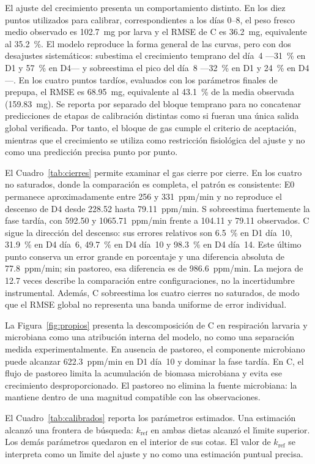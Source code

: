 El ajuste del crecimiento presenta un comportamiento distinto. En los diez puntos utilizados para calibrar, correspondientes a los días 0--8, el peso fresco medio observado es 102.7~mg por larva y el RMSE de C es 36.2~mg, equivalente al 35.2~\%. El modelo reproduce la forma general de las curvas, pero con dos desajustes sistemáticos: subestima el crecimiento temprano del día~4 ---31~\% en D1 y 57~\% en D4--- y sobreestima el pico del día~8 ---32~\% en D1 y 24~\% en D4---. En los cuatro puntos tardíos, evaluados con los parámetros finales de prepupa, el RMSE es 68.95~mg, equivalente al 43.1~\% de la media observada (159.83~mg). Se reporta por separado del bloque temprano para no concatenar predicciones de etapas de calibración distintas como si fueran una única salida global verificada. Por tanto, el bloque de gas cumple el criterio de aceptación, mientras que el crecimiento se utiliza como restricción fisiológica del ajuste y no como una predicción precisa punto por punto.

El Cuadro~\ref{tab:cierres} permite examinar el gas cierre por cierre. En los cuatro no saturados, donde la comparación es completa, el patrón es consistente: E0 permanece aproximadamente entre 256 y 331~ppm/min y no reproduce el descenso de D4 desde 228.52 hasta 79.11~ppm/min. S sobreestima fuertemente la fase tardía, con 592.50 y 1065.71~ppm/min frente a 104.11 y 79.11 observados. C sigue la dirección del descenso: sus errores relativos son 6.5~\% en D1 día~10, 31.9~\% en D4 día~6, 49.7~\% en D4 día~10 y 98.3~\% en D4 día~14. Este último punto conserva un error grande en porcentaje y una diferencia absoluta de 77.8~ppm/min; sin pastoreo, esa diferencia es de 986.6~ppm/min. La mejora de 12.7 veces describe la comparación entre configuraciones, no la incertidumbre instrumental. Además, C sobreestima los cuatro cierres no saturados, de modo que el RMSE global no representa una banda uniforme de error individual.

La Figura~\ref{fig:propios} presenta la descomposición de C en respiración larvaria y microbiana como una atribución interna del modelo, no como una separación medida experimentalmente. En ausencia de pastoreo, el componente microbiano puede alcanzar 622.3~ppm/min en D1 día~10 y dominar la fase tardía. En C, el flujo de pastoreo limita la acumulación de biomasa microbiana y evita ese crecimiento desproporcionado. El pastoreo no elimina la fuente microbiana: la mantiene dentro de una magnitud compatible con las observaciones.

El Cuadro~\ref{tab:calibrados} reporta los parámetros estimados. Una estimaci\'{o}n alcanz\'{o} una frontera de b\'{u}squeda: $k_{\mathrm{ref}}$ en ambas dietas alcanz\'{o} el l\'{\i}mite superior. Los dem\'{a}s par\'{a}metros quedaron en el interior de sus cotas. El valor de $k_{\mathrm{ref}}$ se interpreta como un l\'{\i}mite del ajuste y no como una estimaci\'{o}n puntual precisa.


